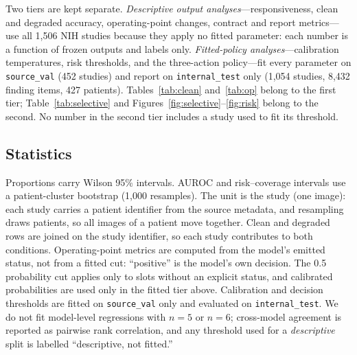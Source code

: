 Two tiers are kept separate. \emph{Descriptive output analyses}---responsiveness, clean and degraded accuracy, operating-point changes, contract and report metrics---use all 1,506 NIH studies because they apply no fitted parameter: each number is a function of frozen outputs and labels only. \emph{Fitted-policy analyses}---calibration temperatures, risk thresholds, and the three-action policy---fit every parameter on \texttt{source\_val} (452 studies) and report on \texttt{internal\_test} only (1,054 studies, 8,432 finding items, 427 patients). Tables~\ref{tab:clean} and~\ref{tab:op} belong to the first tier; Table~\ref{tab:selective} and Figures~\ref{fig:selective}--\ref{fig:risk} belong to the second. No number in the second tier includes a study used to fit its threshold.

\subsection{Statistics}

Proportions carry Wilson 95\% intervals. AUROC and risk--coverage intervals use a patient-cluster bootstrap (1,000 resamples). The unit is the study (one image): each study carries a patient identifier from the source metadata, and resampling draws patients, so all images of a patient move together. Clean and degraded rows are joined on the study identifier, so each study contributes to both conditions. Operating-point metrics are computed from the model's emitted status, not from a fitted cut: ``positive'' is the model's own decision. The 0.5 probability cut applies only to slots without an explicit status, and calibrated probabilities are used only in the fitted tier above. Calibration and decision thresholds are fitted on \texttt{source\_val} only and evaluated on \texttt{internal\_test}. We do not fit model-level regressions with $n=5$ or $n=6$; cross-model agreement is reported as pairwise rank correlation, and any threshold used for a \emph{descriptive} split is labelled ``descriptive, not fitted.''

